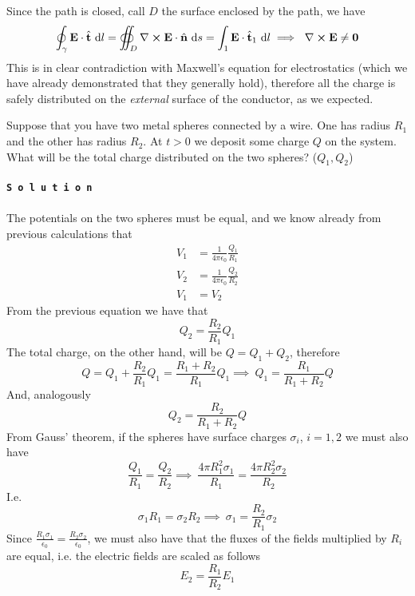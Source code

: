 \documentclass[../electromagnetism]{subfiles}
\begin{document}
Since the path is closed, call $D$ the surface enclosed by the path, we have
\begin{equation}
	\oint_\gamma\vec{E}\cdot\ver{t}\dd l=\oiint_D\nabla\cross\vec{E}\cdot\ver{n}\dd s=\int_1\vec{E}\cdot\ver{t}_1\dd l\implies\ \nabla\cross\vec{E}\ne\vec{0}
	\label{eq:contradictioncond}
\end{equation}
This is in clear contradiction with Maxwell's equation for electrostatics (which we have already demonstrated that they generally hold), therefore all the charge is safely distributed on the \textit{external} surface of the conductor, as we expected.
\begin{exe}
	Suppose that you have two metal spheres connected by a wire. One has radius $R_1$ and the other has radius $R_2$. At $t>0$ we deposit some charge $Q$ on the system. What will be the total charge distributed on the two spheres? ($Q_1,Q_2$)\\\\
	\texttt{\textbf{S o l u t i o n}}\\\\
	The potentials on the two spheres must be equal, and we know already from previous calculations that
	\begin{equation}
		\begin{aligned}
			V_1&=\frac{1}{4\pi\epsilon_0}\frac{Q_1}{R_1}\\
			V_2&=\frac{1}{4\pi\epsilon_0}\frac{Q_2}{R_2}\\
			V_1&=V_2
		\end{aligned}
		\label{eq:spherepot}
	\end{equation}
	From the previous equation we have that
	\begin{equation}
		Q_2=\frac{R_2}{R_1}Q_1
		\label{eq:q2}
	\end{equation}
	The total charge, on the other hand, will be $Q=Q_1+Q_2$, therefore
	\begin{equation}
		Q=Q_1+\frac{R_2}{R_1}Q_1=\frac{R_1+R_2}{R_1}Q_1\implies\ Q_1=\frac{R_1}{R_1+R_2}Q
		\label{eq:totalcharge1}
	\end{equation}
	And, analogously
	\begin{equation}
		Q_2=\frac{R_2}{R_1+R_2}Q
		\label{eq:totalcharge2}
	\end{equation}
	From Gauss' theorem, if the spheres have surface charges $\sigma_i$, $i=1,2$ we must also have
	\begin{equation}
		\frac{Q_1}{R_1}=\frac{Q_2}{R_2}\implies\ \frac{4\pi R^2_1\sigma_1}{R_1}=\frac{4\pi R_2^2\sigma_2}{R_2}
		\label{eq:gausslaw}
	\end{equation}
	I.e.
	\begin{equation*}
		\sigma_1R_1=\sigma_2R_2\implies\ \sigma_1=\frac{R_2}{R_1}\sigma_2
	\end{equation*}
	Since $\frac{R_1\sigma_1}{\epsilon_0}=\frac{R_2\sigma_2}{\epsilon_0}$, we must also have that the fluxes of the fields multiplied by $R_i$ are equal, i.e. the electric fields are scaled as follows
	\begin{equation}
		E_2=\frac{R_1}{R_2}E_1
		\label{eq:efield2spheres}
	\end{equation}
	\hfill\square
\end{exe}
\end{document}
